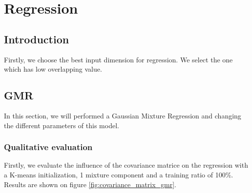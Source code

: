 \section{Regression}
\label{regression}

\subsection{Introduction}
Firstly, we choose the best input dimension for regression. We select the one which has low overlapping value.

\subsection{GMR} 



In this section, we will performed a Gaussian Mixture Regression and changing the different parameters of this model. 
\subsubsection{Qualitative evaluation}
Firstly, we evaluate the influence of the covariance matrice on the regression with a K-means initialization, 1 mixture component and a training ratio of 100\%. Results are shown on figure \ref{fig:covariance_matrix_gmr}.


